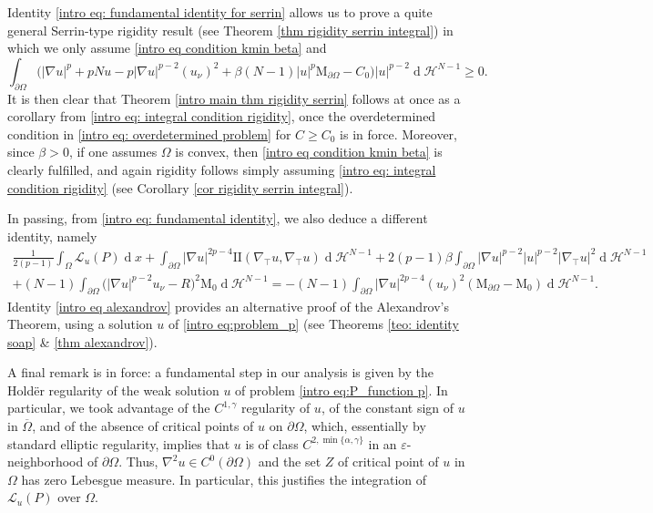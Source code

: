 \documentclass[10pt,a4paper]{amsart}
\numberwithin{equation}{section}
\renewcommand{\d}[1]{\ensuremath{\operatorname{d}\!{#1}}}
\begin{document}
Identity \ref{intro eq: fundamental identity for serrin} allows us to prove a quite general Serrin-type rigidity result (see Theorem \ref{thm rigidity serrin integral}) in which we only assume \eqref{intro eq condition kmin beta} and
\begin{equation}\label{intro eq: integral condition rigidity}
    \int_{\partial\Omega} \Big( |\nabla u|^p + pNu - p |\nabla u|^{p-2} (u_\nu)^2 + \beta(N-1) |u|^p \mathrm{M}_{\partial\Omega}  - C_0 \Big) |u|^{p-2} \d{}\mathcal{H}^{N-1} \geq 0.
\end{equation}
It is then clear that Theorem \ref{intro main thm rigidity serrin} follows at once as a corollary from \eqref{intro eq: integral condition rigidity}, once the overdetermined condition in \eqref{intro eq: overdetermined problem} for $C \geq C_0$ is in force. Moreover, since $\beta > 0$, if one assumes $\Omega$ is convex, then \eqref{intro eq condition kmin beta} is clearly fulfilled,  and again rigidity follows simply assuming \eqref{intro eq: integral condition rigidity} (see Corollary \ref{cor rigidity serrin integral}).


In passing, from \eqref{intro eq: fundamental identity}, we also deduce a different identity, namely
\begin{equation}\label{intro eq alexandrov}
    \begin{aligned}
    \frac{1}{2(p-1)}\int_\Omega \mathcal{L}_u(P) \d{x} 
    +\int_{\partial\Omega} |\nabla u|^{2p-4} \mathrm{I\!I}(\nabla_\top u,\nabla_\top u) \d{}\mathcal{H}^{N-1}
    + 2(p-1)\beta \int_{\partial\Omega} |\nabla u|^{p-2}|u|^{p-2}|\nabla_\top u|^2 \d{}\mathcal{H}^{N-1} 
    \\
    + (N-1) \int_{\partial\Omega} \Big(|\nabla u|^{p-2} u_\nu - R \Big)^2  \mathrm{M}_{0} \d{}\mathcal{H}^{N-1} 
    =
    - (N-1) \int_{\partial\Omega} |\nabla u|^{2p-4} (u_\nu)^2 (\mathrm{M}_{\partial\Omega} - \mathrm{M}_{0} ) \d{}\mathcal{H}^{N-1}.  
    \end{aligned}
\end{equation}
Identity \eqref{intro eq alexandrov} provides an alternative proof of the Alexandrov's Theorem, using a solution $u$ of \eqref{intro eq:problem_p} (see Theorems \ref{teo: identity soap} \& \ref{thm alexandrov}).

A final remark is in force: a fundamental step in our analysis is given by the Hold\"er regularity of the weak solution $u$ of problem \eqref{intro eq:P_function p}. In particular, we took advantage of the $C^{1,\gamma}$ regularity of $u$, of the constant sign of $u$ in $\overline{\Omega}$, and of the absence of critical points of $u$ on $\partial\Omega$, which, essentially by standard elliptic regularity, implies that $u$ is of class $C^{2,\min\{\alpha,\gamma\}}$ in an $\varepsilon$-neighborhood of $\partial\Omega$. Thus, $\nabla^2 u \in C^0(\partial\Omega)$ and the set $Z$ of critical point of $u$ in $\Omega$ has zero Lebesgue measure. In particular, this justifies the integration of $\mathcal{L}_u(P)$ over $\Omega$.
\end{document}
